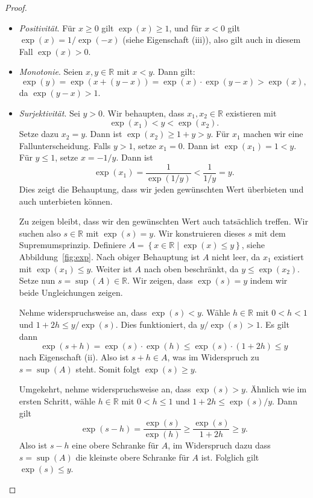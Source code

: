 \documentclass[../main.tex]{subfiles}
\begin{document}
\begin{proof}
  \leavevmode
  \begin{itemize}
    \item \emph{Positivität}. 
      Für $x \geq 0$ gilt $\exp(x) \geq 1$,
      und für $x < 0 $ gilt $\exp(x) = 1/\exp(-x)$
      (siehe Eigenschaft (iii)), also gilt
      auch in diesem Fall
      $\exp(x) > 0$.
    \item \emph{Monotonie}. 
      Seien $x, y \in \mathbb{R}$ mit $x < y$.
      Dann gilt:
      \[
        \exp(y) = \exp(x + (y - x))
        = \exp(x) \cdot \exp(y-x)
        > \exp(x),
      \]
      da $\exp(y-x) > 1$.
    \item \emph{Surjektivität}.
      Sei $y > 0$. Wir behaupten,
      dass $x_1, x_2 \in \mathbb{R}$ existieren mit 
      \[
        \exp(x_1) < y < \exp(x_2).
      \]
      Setze dazu $x_2 = y$. Dann ist
        $\exp(x_2) \geq 1 + y > y$.
      Für $x_1$ machen wir eine Fallunterscheidung.
      Falls $y > 1$, setze $x_1 = 0$. Dann ist
      $\exp(x_1) = 1 < y$. Für $y \leq 1$, setze
      $x = -1/y$. Dann ist
       \[
         \exp(x_1) = \frac{1}{\exp(1/y)} < \frac{1}{1/y} = y.
      \]
      Dies zeigt die Behauptung, dass wir jeden gewünschten
      Wert überbieten und auch unterbieten können.

      Zu zeigen bleibt, dass wir den gewünschten Wert auch
      tatsächlich treffen.
      Wir suchen also $s \in \mathbb{R}$ mit $\exp(s) = y$.
      Wir konstruieren dieses $s$ mit dem Supremumsprinzip.
      Definiere
      $A = \left\{x \in \mathbb{R} \mid \exp(x) \leq y\right\}$,
      siehe Abbildung~\ref{fig:exp}.
      Nach obiger Behauptung ist $A$ nicht leer,
      da $x_1$ existiert mit $\exp(x_1) \leq y$.
      Weiter ist $A$ nach oben beschränkt,
      da $y \leq \exp(x_2)$.
      Setze nun $s = \sup(A) \in \mathbb{R}$.
      Wir zeigen, dass $\exp(s) = y$ indem wir
      beide Ungleichungen zeigen.

      Nehme widerspruchsweise an, dass $\exp(s) < y$.
      Wähle $h \in \mathbb{R}$ mit $0 < h < 1$
      und $1 + 2h \leq y/\exp(s)$.
      Dies funktioniert, da $y/\exp(s) > 1$.
      Es gilt dann
       \[
         \exp(s + h) = \exp(s) \cdot \exp(h) \leq \exp(s)
         \cdot (1 + 2h) \leq y
      \]
      nach Eigenschaft (ii).
      Also ist $s + h \in A$, was im Widerspruch zu
      $s = \sup(A)$ steht.
      Somit folgt $\exp(s) \geq y$.
      
      Umgekehrt, nehme widerspruchsweise an,
      dass $\exp(s) > y$. Ähnlich wie im ersten Schritt, wähle
      $h \in \mathbb{R}$ mit $0 < h \leq 1$ 
      und $1 + 2h \leq \exp(s)/y$.
      Dann gilt
      \[
        \exp(s-h) = \frac{\exp(s)}{\exp(h)}
        \geq \frac{\exp(s)}{1 + 2h} \geq y.
      \]
      Also ist $s-h$ eine obere Schranke für $A$,
      im Widerspruch dazu dass $s = \sup(A)$ die
      kleinste obere Schranke für $A$ ist.
      Folglich gilt $\exp(s) \leq y$. \qedhere
  \end{itemize}
\end{proof}
\end{document}
